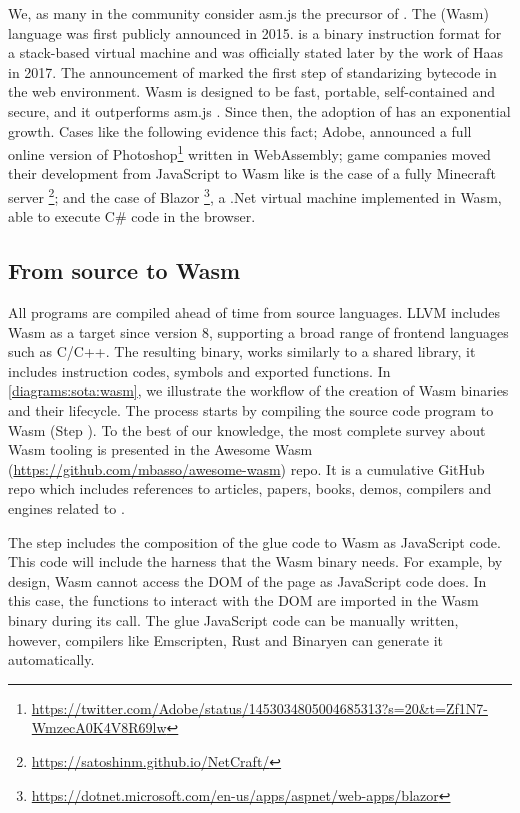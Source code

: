 We, as many in the community consider asm.js the precursor of \wasm. The \wasm (Wasm) language was first publicly announced in 2015. \wasm is a binary instruction format for a stack-based virtual machine and was officially stated later by the work of Haas \etal \cite{Haas_2017} in 2017. The announcement of \wasm marked the first step of standarizing bytecode in the web environment. Wasm is designed to be fast, portable, self-contained and secure, and it outperforms asm.js \cite{Haas_2017}. Since then, the adoption of \wasm has an exponential growth. Cases like the following evidence this fact; Adobe, announced a full online version of Photoshop\footnote{\url{https://twitter.com/Adobe/status/1453034805004685313?s=20&t=Zf1N7-WmzecA0K4V8R69lw}} written in WebAssembly;  game companies moved their development from JavaScript to Wasm like is the case of a fully Minecraft server \footnote{\url{https://satoshinm.github.io/NetCraft/}}; and the case of Blazor \footnote{\url{https://dotnet.microsoft.com/en-us/apps/aspnet/web-apps/blazor}}, a .Net virtual machine implemented in Wasm, able to execute C\# code in the browser.


\subsection*{From source to Wasm}

All \wasm programs are compiled ahead of time from source languages. LLVM includes Wasm as a target since version 8, supporting a broad range of frontend languages such as C/C++. The resulting binary, works similarly to a shared library, it includes instruction codes, symbols and exported functions. In \autoref{diagrams:sota:wasm}, we illustrate the workflow of the creation of Wasm binaries and their lifecycle. The process starts by compiling the source code program to Wasm (Step ). To the best of our knowledge, the most complete survey about Wasm tooling is presented in the Awesome Wasm (\url{https://github.com/mbasso/awesome-wasm}) repo. It is a cumulative GitHub repo which includes references to articles, papers, books, demos, compilers and engines related to \wasm. 

The step  includes the composition of the glue code to Wasm as JavaScript code. This code will include the harness that the Wasm binary needs. For example, by design, Wasm cannot access the DOM of the page as JavaScript code does. In this case, the functions to interact with the DOM are imported in the Wasm binary during its call. The glue JavaScript code can be manually written, however, compilers like Emscripten, Rust and Binaryen can generate it automatically.

